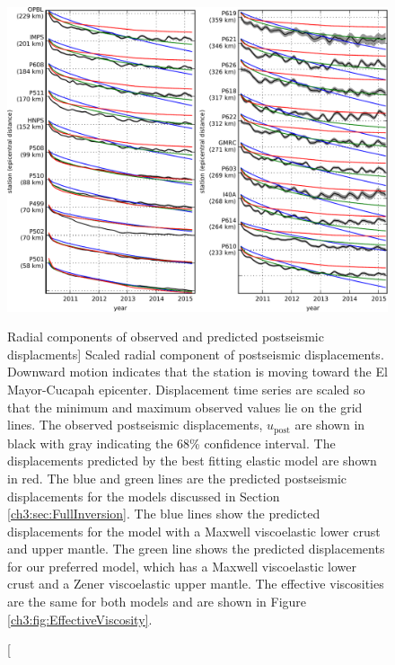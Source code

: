 \begin{figure}
\includegraphics[scale=0.9]{ch3/figures/2016jb013114-p07}
\caption
[Radial components of observed and predicted postseismic displacments]
{Scaled radial component of postseismic displacements.
Downward motion indicates that the station is moving toward the El
Mayor-Cucapah epicenter.  Displacement time series are scaled so that
the minimum and maximum observed values lie on the grid lines.  The
observed postseismic displacements, $u_\mathrm{post}$ are shown in
black with gray indicating the 68\% confidence interval.  The
displacements predicted by the best fitting elastic model are shown in
red.  The blue and green lines are the predicted postseismic
displacements for the models discussed in Section
\ref{ch3:sec:FullInversion}. The blue lines show the predicted
displacements for the model with a Maxwell viscoelastic lower crust
and upper mantle.  The green line shows the predicted displacements
for our preferred model, which has a Maxwell viscoelastic lower crust
and a Zener viscoelastic upper mantle.  The effective viscosities are
the same for both models and are shown in Figure
\ref{ch3:fig:EffectiveViscosity}.}
\label{ch3:fig:RecordSectionMain}
\end{figure}

